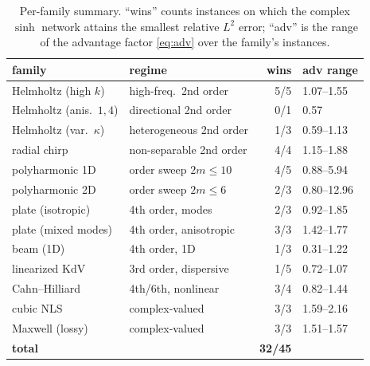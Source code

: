 \begin{table}[htbp]
\centering
\small
\caption{Per-family summary. ``wins'' counts instances on which the complex
\(\sinh\) network attains the smallest relative \(L^2\) error; ``adv'' is the
range of the advantage factor \eqref{eq:adv} over the family's instances.}
\label{tab:res-summary}
\begin{tabular}{@{}llrl@{}}
\toprule
family & regime & wins & adv range \\
\midrule
Helmholtz (high \(k\))       & high-freq.\ 2nd order   & 5/5 & 1.07--1.55 \\
Helmholtz (anis.\ \(1,4\))   & directional 2nd order   & 0/1 & 0.57 \\
Helmholtz (var.\ \(\kappa\)) & heterogeneous 2nd order & 1/3 & 0.59--1.13 \\
radial chirp                 & non-separable 2nd order & 4/4 & 1.15--1.88 \\
\midrule
polyharmonic 1D              & order sweep \(2m\le10\)  & 4/5 & 0.88--5.94 \\
polyharmonic 2D              & order sweep \(2m\le6\)   & 2/3 & 0.80--12.96 \\
plate (isotropic)            & 4th order, modes        & 2/3 & 0.92--1.85 \\
plate (mixed modes)          & 4th order, anisotropic  & 3/3 & 1.42--1.77 \\
beam (1D)                    & 4th order, 1D           & 1/3 & 0.31--1.22 \\
linearized KdV               & 3rd order, dispersive   & 1/5 & 0.72--1.07 \\
Cahn--Hilliard               & 4th/6th, nonlinear      & 3/4 & 0.82--1.44 \\
\midrule
cubic NLS                    & complex-valued          & 3/3 & 1.59--2.16 \\
Maxwell (lossy)              & complex-valued          & 3/3 & 1.51--1.57 \\
\midrule
\textbf{total}               &                         & \textbf{32/45} & \\
\bottomrule
\end{tabular}
\end{table}
